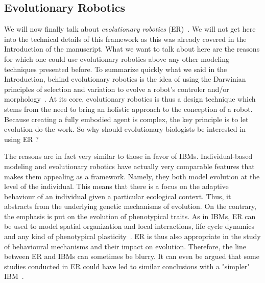     \subsection{Evolutionary Robotics} 

        We will now finally talk about \emph{evolutionary robotics} (ER)~\parencite{Nolfi2000, Doncieux2015a}. We will not get here into the technical details of this framework as this was already covered in the Introduction of the manuscript. What we want to talk about here are the reasons for which one could use evolutionary robotics above any other modeling techniques presented before. To summarize quickly what we said in the Introduction, behind evolutionary robotics is the idea of using the Darwinian principles of selection and variation to evolve a robot's controler and/or morphology~\parencite{Floreano2010, Doncieux2014}. At its core, evolutionary robotics is thus a design technique which stems from the need to bring an holistic approach to the conception of a robot. Because creating a fully embodied agent is complex, the key principle is to let evolution do the work. So why should evolutionary biologists be interested in using ER ?

        The reasons are in fact very similar to those in favor of IBMs. Individual-based modeling and evolutionary robotics have actually very comparable features that makes them appealing as a framework. Namely, they both model evolution at the level of the individual. This means that there is a focus on the adaptive behaviour of an individual given a particular ecological context. Thus, it abstracts from the underlying genetic mechanisms of evolution. On the contrary, the emphasis is put on the evolution of phenotypical traits. As in IBMs, ER can be used to model spatial organization and local interactions, life cycle dynamics and any kind of phenotypical plasticity~\parencite{Mitri2012}. ER is thus also appropriate in the study of behavioural mechanisms and their impact on evolution. Therefore, the line between ER and IBMs can sometimes be blurry. It can even be argued that some studies conducted in ER could have led to similar conclusions with a "simpler" IBM~\parencite{Mitri2012}.


